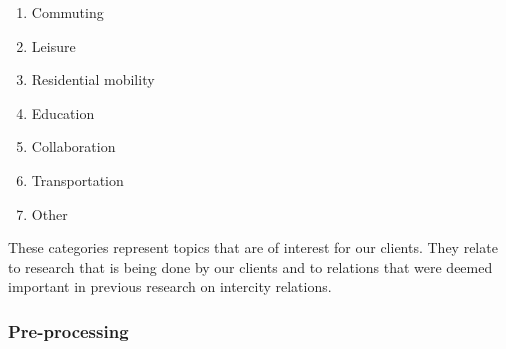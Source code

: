 \begin{enumerate}
    \item Commuting
    \item Leisure
    \item Residential mobility
    \item Education
    \item Collaboration
    \item Transportation
    \item Other
\end{enumerate}

These categories represent topics that are of interest for our clients. They relate to research that is being done by our clients and to relations that were deemed important in previous research on intercity relations.

\subsubsection{Pre-processing}

